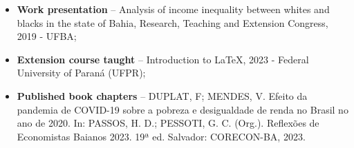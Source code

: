\documentclass[10pt,a4paper]{cv}
\begin{document}


\divider


\divider





\begin{itemize}
  \item \textbf{Work presentation} -- Analysis of income inequality between whites and blacks in the state of Bahia, Research, Teaching and Extension Congress, 2019 - UFBA;
  
  \item \textbf{Extension course taught} -- Introduction to \LaTeX{}, 2023 - Federal University of Paraná (UFPR);
  
  \item \textbf{Published book chapters} -- DUPLAT, F; MENDES, V. Efeito da pandemia de COVID-19 sobre a pobreza e desigualdade de renda no Brasil no ano de 2020. In: PASSOS, H. D.; PESSOTI, G. C. (Org.). Reflexões de Economistas Baianos 2023. 19ª ed. Salvador: CORECON-BA, 2023.
\end{itemize}







\end{document}
